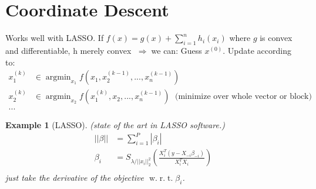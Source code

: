 \documentclass[10pt]{article}
\newtheorem{example}[ex]{Example}
\DeclareMathOperator*{\argmin}{argmin}
\newcommand{\wrt}{\ensuremath{\;\mathrm{w.}\;\mathrm{r.}\;\mathrm{t.}\;}}
\newcommand{\then}{\ensuremath{\;\Rightarrow\;}}
\begin{document}
\section{Coordinate Descent}
Works well with LASSO.%
If $f(x)=g(x)+\sum_{i=1}^nh_i(x_i)$ where $g$ is convex and differentiable, h merely convex
\then we can:
Guess $x^{(0)}$.  Update according to:
\begin{align*}
x_1^{(k)}&\in \argmin_{x_1} f(x_1,x_2^{(k-1)},...,x_n^{(k-1)})\\
x_2^{(k)}&\in \argmin_{x_2} f(x_1^{(k)},x_2,...,x_n^{(k-1)})\; \text{ (minimize over whole vector or block)}\\
...&
\end{align*}


\begin{example}[LASSO]
  (state of the art in LASSO software.)
  \begin{align*}
    ||\beta||&=\sum_{i=1}^P|\beta_i|\\
    \beta_i&=S_{\lambda/||x_i||_2^2}\left(\frac{X_i^T(y-X_{-i}\beta_{-i})}{X_i^TX_i}\right)\\
    \end{align*}
  just take the derivative of the objective \wrt $\beta_i$.
\end{example}



\end{document}
